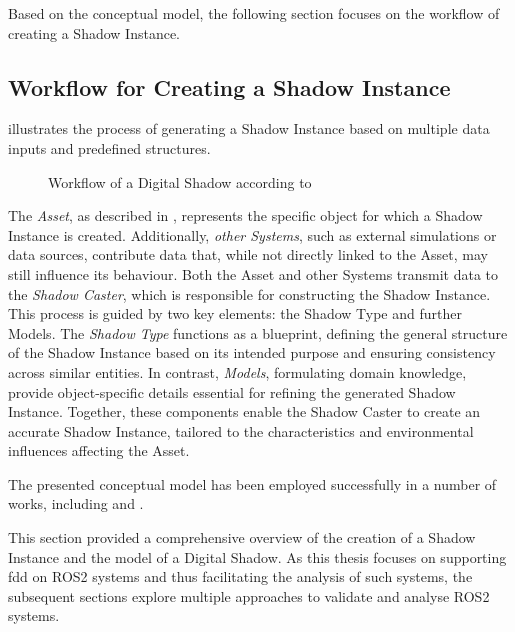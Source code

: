     Based on the conceptual model, the following section focuses on the workflow of creating a Shadow Instance.

    \subsection{Workflow for Creating a Shadow Instance} \label{subsec:DSWorkFlow}

     illustrates the process of generating a Shadow Instance based on multiple data inputs and predefined structures.
    \begin{figure}[h]
        \centering
        
        \caption[Workflow of a Digital Shadow]{Workflow of a Digital Shadow according to \cite{DSConceptualModelElsevier}} \label{fig:tikz:DSworkflow}
    \end{figure}

    The \emph{Asset}, as described in , represents the specific object for which a Shadow Instance is created. Additionally, \emph{other Systems}, such as external simulations or data sources, contribute data that, while not directly linked to the Asset, may still influence its behaviour.
    Both the Asset and other Systems transmit data to the \emph{Shadow Caster}, which is responsible for constructing the Shadow Instance. This process is guided by two key elements: the Shadow Type and further Models. The \emph{Shadow Type} functions as a blueprint, defining the general structure of the Shadow Instance based on its intended purpose and ensuring consistency across similar entities. In contrast, \emph{Models}, formulating domain knowledge, provide object-specific details essential for refining the generated Shadow Instance.\newline
    Together, these components enable the Shadow Caster to create an accurate Shadow Instance, tailored to the characteristics and environmental influences affecting the Asset. \cite[p.~836]{DSConceptualModelElsevier}

    The presented conceptual model has been employed successfully in a number of works, including \Textcite{IIOTinsightsByDS} and \Textcite{DSinProdControl}.

This section provided a comprehensive overview of the creation of a Shadow Instance and the model of a Digital Shadow. As this thesis focuses on supporting \acl{fdd} on ROS2 systems and thus facilitating the analysis of such systems, the subsequent sections explore multiple approaches to validate and analyse ROS2 systems.


